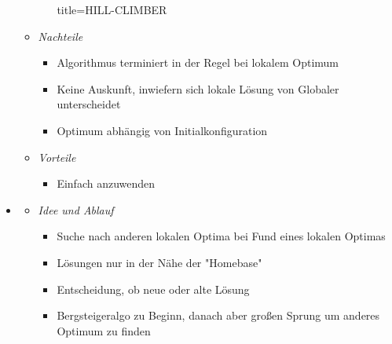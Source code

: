 \documentclass[
    12pt,
    a4paper,
    ngerman,
    color=3b,%
    marginpar=false,
    colorback=false,
    leqno,
]{tudaexercise}
\begin{document}
\begin{itemize}
\begin{itemize}
\begin{itemize}
\begin{ccode}[autogobble,fontsize=\small]{title={HILL-CLIMBER}}
                            \end{ccode}
                    \end{itemize}
\pagebreak
                \item \textit{Nachteile}
                    \begin{itemize}
                        \item Algorithmus terminiert in der Regel bei lokalem Optimum
                        \item Keine Auskunft, inwiefern sich lokale Lösung von Globaler unterscheidet
                        \item Optimum abhängig von Initialkonfiguration
                    \end{itemize}
                \item \textit{Vorteile}
                    \begin{itemize}
                        \item Einfach anzuwenden
                    \end{itemize}
            \end{itemize}

        \item {}
            \begin{itemize}
                \item \textit{Idee und Ablauf}
                    \begin{itemize}
                        \item Suche nach anderen lokalen Optima bei Fund eines lokalen Optimas
                        \item Lösungen nur in der Nähe der \string"Homebase\string"
                        \item Entscheidung, ob neue oder alte Lösung
                        \item Bergsteigeralgo zu Beginn, danach aber großen Sprung um anderes Optimum zu finden
                    \end{itemize}


\end{itemize}
\end{itemize}
\end{document}
